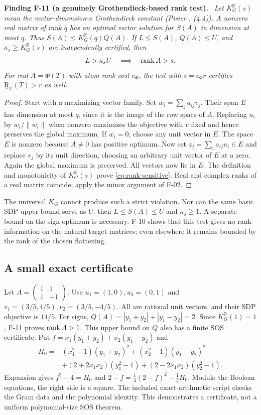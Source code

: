 \documentclass[11pt]{article}
\newcommand{\R}{\mathbb R}\newcommand{\C}{\mathbb C}
\newcommand{\BR}{\underline{\mathrm R}}\newcommand{\TR}{\mathrm R}
\newenvironment{finding}[2]{\par\medskip\noindent\textbf{Finding #1 (#2).}\ \itshape}{\par\medskip}
\begin{document}
\begin{finding}{F-11}{a genuinely Grothendieck-based rank test}
Let $K_G^\R(s)$ mean the vector-dimension-$s$ Grothendieck constant
(Pisier \cite{Pis}, (4.4)). A nonzero real matrix of rank $q$ has an
optimal vector solution for $S(A)$ in dimension at most $q$.
Thus $S(A)\leq K_G^\R(q)Q(A)$.
If $L\leq S(A)$, $Q(A)\leq U$, and
$\kappa_s\geq K_G^\R(s)$ are independently certified, then
\begin{equation}\label{eq:rank-sensitive}
 L>\kappa_s U\quad\Longrightarrow\quad\operatorname{rank} A>s.
\end{equation}
For real $A=\Phi(T)$ with atom rank cost $c_\Phi$, the test with
$s=c_\Phi r$ certifies $\BR_\C(T)>r$ as well.
\end{finding}
\begin{proof}
Start with a maximizing vector family. Set $w_i=\sum_j a_{ij}v_j$.
Their span $E$ has dimension at most $q$, since it is the image
of the row space of $A$. Replacing $u_i$ by $w_i/\|w_i\|$ when
nonzero maximizes the objective with $v$ fixed and hence preserves
the global maximum. If $w_i=0$, choose any unit vector in $E$.
The space $E$ is nonzero because $A\ne0$ has positive optimum.
Now set $z_j=\sum_i a_{ij}u_i\in E$ and replace $v_j$ by its unit
direction, choosing an arbitrary unit vector of $E$ at a zero.
Again the global maximum is preserved. All vectors now lie in $E$.
The definition and monotonicity of $K_G^\R(s)$ prove
\eqref{eq:rank-sensitive}. Real and complex ranks of a real matrix
coincide; apply the minor argument of F-02.
\end{proof}
The universal $K_G$ cannot produce such a strict violation.
Nor can the same basic SDP upper bound serve as $U$:
then $L\leq S(A)\leq U$ and $\kappa_s\geq1$.
A separate bound on the sign optimum is necessary.
F-10 shows that this test gives no rank information on the
natural target matrices; even elsewhere it remains bounded by
the rank of the chosen flattening.

\subsection{A small exact certificate}
Let $A=\left(\begin{smallmatrix}1&1\\1&-1\end{smallmatrix}\right)$.
Use $u_1=(1,0),u_2=(0,1)$ and
$v_1=(3/5,4/5),v_2=(3/5,-4/5)$. All are rational unit vectors,
and their SDP objective is $14/5$.
For signs,
$Q(A)=|y_1+y_2|+|y_1-y_2|=2$.
Since $K_G^\R(1)=1$, F-11 proves $\operatorname{rank} A>1$.
This upper bound on $Q$ also has a finite SOS certificate.
Put $f=x_1(y_1+y_2)+x_2(y_1-y_2)$ and
\begin{align*}
 H_0={}&(x_1^2-1)(y_1+y_2)^2+(x_2^2-1)(y_1-y_2)^2\\
 &+(2+2x_1x_2)(y_1^2-1)+(2-2x_1x_2)(y_2^2-1).
\end{align*}
Expansion gives $f^2-4=H_0$ and
$2-f=\frac14(2-f)^2-\frac14H_0$.
Modulo the Boolean equations, the right side is a square.
The included exact-arithmetic script checks the Gram data and the
polynomial identity. This demonstrates a certificate, not a
uniform polynomial-size SOS theorem.
\end{document}
